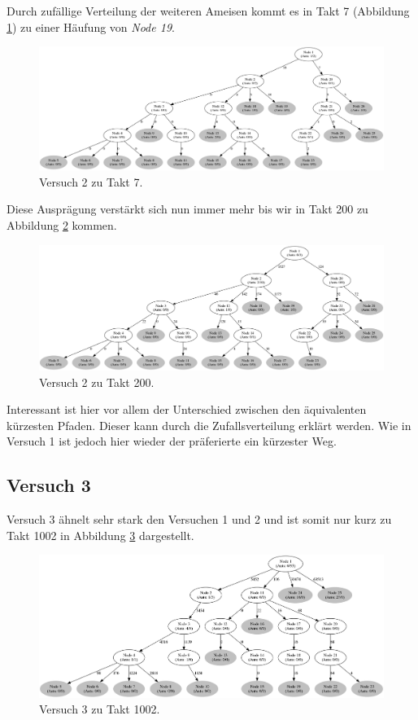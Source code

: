 Durch zufällige Verteilung der weiteren Ameisen kommt es in Takt 7 (Abbildung \ref{fig:v2_7}) zu einer Häufung von \emph{Node 19}.

\begin{figure}[htbp]
	\includegraphics[width=.9\textwidth]{images/v2_7.png}
	\caption{Versuch 2 zu Takt 7.}
	\label{fig:v2_7}
\end{figure}

Diese Ausprägung verstärkt sich nun immer mehr bis wir in Takt 200 zu Abbildung \ref{fig:v2_200} kommen.

\begin{figure}[htbp]
	\includegraphics[width=.9\textwidth]{images/v2_200.png}
	\caption{Versuch 2 zu Takt 200.}
	\label{fig:v2_200}
\end{figure}

Interessant ist hier vor allem der Unterschied zwischen den äquivalenten kürzesten Pfaden. Dieser kann durch die Zufallsverteilung erklärt werden.
Wie in Versuch 1 ist jedoch hier wieder der präferierte ein kürzester Weg.

\subsection{Versuch 3}
Versuch 3 ähnelt sehr stark den Versuchen 1 und 2 und ist somit nur kurz zu Takt 1002 in Abbildung \ref{fig:v3_1002} dargestellt.

\begin{figure}[htbp]
	\includegraphics[width=.9\textwidth]{images/v3_1002.png}
	\caption{Versuch 3 zu Takt 1002.}
	\label{fig:v3_1002}
\end{figure}


